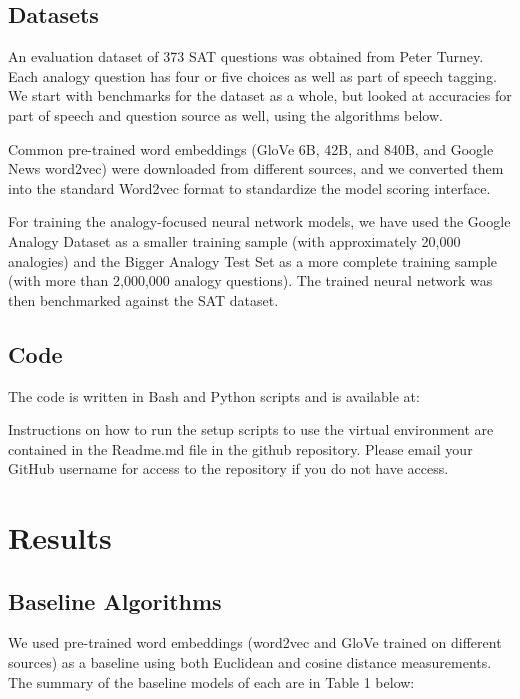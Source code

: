 \documentclass[11pt]{article}
\begin{document}
\subsection{Datasets}

An evaluation dataset of 373 SAT questions was obtained from Peter
Turney. Each analogy question has four or five choices as well as part
of speech tagging. We start with benchmarks for the dataset as a whole,
but looked at accuracies for part of speech and question source as well,
using the algorithms below.

Common pre-trained word embeddings (GloVe 6B, 42B, and 840B, and Google
News word2vec) were downloaded from different sources, and we converted
them into the standard Word2vec format to standardize the model scoring
interface.

For training the analogy-focused neural network models, we have used the
Google Analogy Dataset as a smaller training sample (with approximately
20,000 analogies) and the Bigger Analogy Test Set as a more complete
training sample (with more than 2,000,000 analogy questions). The
trained neural network was then benchmarked against the SAT dataset.

\subsection{Code}

The code is written in Bash and Python scripts and is available at:

Instructions on how to run the setup scripts to use the virtual
environment are contained in the Readme.md file in the github
repository. Please email
your GitHub username for access to the repository if you do not have
access.

\section{Results }

\subsection{Baseline Algorithms}

We used pre-trained word embeddings (word2vec and GloVe trained on
different sources) as a baseline using both Euclidean and cosine
distance measurements. The summary of the baseline models of each are in
Table 1 below:
\end{document}
